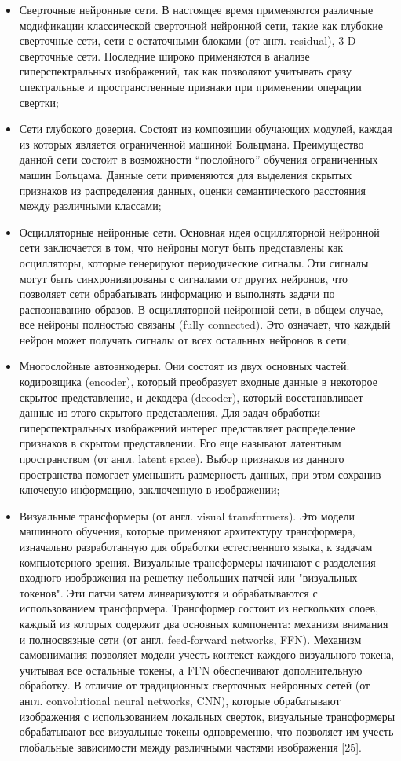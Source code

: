 \documentclass[14pt, russian]{scrartcl}
\begin{document}
\begin{itemize}
    \item Сверточные нейронные сети. В настоящее время применяются различные модификации классической сверточной нейронной сети, такие как глубокие сверточные сети, сети с остаточными блоками (от англ. residual), 3-D сверточные сети. Последние широко применяются в анализе гиперспектральных изображений, так как позволяют учитывать сразу спектральные и пространственные признаки при применении операции свертки;
    \item Сети глубокого доверия. Состоят из композиции обучающих модулей, каждая из которых является ограниченной машиной Больцмана. Преимущество данной сети состоит в возможности “послойного” обучения ограниченных машин Больцама. Данные сети применяются для выделения скрытых признаков из распределения данных, оценки семантического расстояния между различными классами;
    \item Осцилляторные нейронные сети. Основная идея осцилляторной нейронной сети заключается в том, что нейроны могут быть представлены как осцилляторы, которые генерируют периодические сигналы. Эти сигналы могут быть синхронизированы с сигналами от других нейронов, что позволяет сети обрабатывать информацию и выполнять задачи по распознаванию образов. В осцилляторной нейронной сети, в общем случае, все нейроны полностью связаны (fully connected). Это означает, что каждый нейрон может получать сигналы от всех остальных нейронов в сети;
    \item Многослойные автоэнкодеры. Они состоят из двух основных частей: кодировщика (encoder), который преобразует входные данные в некоторое скрытое представление, и декодера (decoder), который восстанавливает данные из этого скрытого представления. Для задач обработки гиперспектральных изображений интерес представляет распределение признаков в скрытом представлении. Его еще называют латентным пространством (от англ. latent space). Выбор признаков из данного пространства помогает уменьшить размерность данных, при этом сохранив ключевую информацию, заключенную в изображении;
    \item Визуальные трансформеры (от англ. visual transformers). Это модели машинного обучения, которые применяют архитектуру трансформера, изначально разработанную для обработки естественного языка, к задачам компьютерного зрения. Визуальные трансформеры начинают с разделения входного изображения на решетку небольших патчей или "визуальных токенов". Эти патчи затем линеаризуются и обрабатываются с использованием трансформера. Трансформер состоит из нескольких слоев, каждый из которых содержит два основных компонента: механизм внимания и полносвязные сети (от англ. feed-forward networks, FFN). Механизм самовнимания позволяет модели учесть контекст каждого визуального токена, учитывая все остальные токены, а FFN обеспечивают дополнительную обработку. В отличие от традиционных сверточных нейронных сетей (от англ. convolutional neural networks, CNN), которые обрабатывают изображения с использованием локальных сверток, визуальные трансформеры обрабатывают все визуальные токены одновременно, что позволяет им учесть глобальные зависимости между различными частями изображения [25].
\end{itemize}
\end{document}
